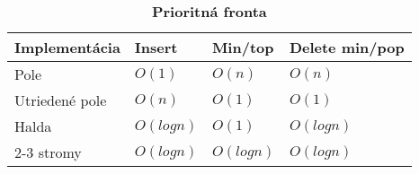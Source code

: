 		\begin{table}[h]
			\centering
			\caption{\textbf{Prioritná fronta}}
			\label{my-label}
			\begin{tabular}{|l|l|l|l|}
			\hline
			\textbf{Implementácia} & \textbf{Insert} & \textbf{Min/top} & \textbf{Delete min/pop}   \\ \hline
			Pole                   & $O(1)$            & $O(n)$             & $O(n)$                       \\ \hline
			Utriedené pole         & $O(n)$            & $O(1)$             & $O(1)$                       \\ \hline
			Halda                  & $O(log n)$        & $O(1)$             & $O(log n)$                  \\ \hline
			2-3 stromy             & $O(log n)$        & $O(log n)$         & $O(log n)$                   \\ \hline
			\end{tabular}
		\end{table}
